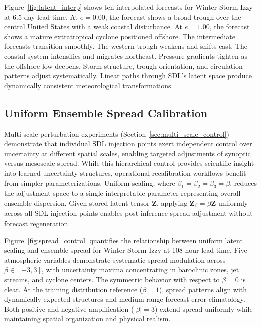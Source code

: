 \documentclass{agujournal2019}
\begin{document}
Figure~\ref{fig:latent_interp} shows ten interpolated forecasts for Winter Storm Izzy at 6.5-day lead time. At $e{=}0.00$, the forecast shows a broad trough over the central United States with a weak coastal disturbance. At $e{=}1.00$, the forecast shows a mature extratropical cyclone positioned offshore. The intermediate forecasts transition smoothly. The western trough weakens and shifts east. The coastal system intensifies and migrates northeast. Pressure gradients tighten as the offshore low deepens. Storm structure, trough orientation, and circulation patterns adjust systematically. Linear paths through SDL's latent space produce dynamically consistent meteorological transformations.

\subsection{Uniform Ensemble Spread Calibration}



Multi-scale perturbation experiments (Section~\ref{sec:multi_scale_control}) demonstrate that individual SDL injection points exert independent control over uncertainty at different spatial scales, enabling targeted adjustments of synoptic versus mesoscale spread. While this hierarchical control provides scientific insight into learned uncertainty structures, operational recalibration workflows benefit from simpler parameterizations. Uniform scaling, where $\beta_1 = \beta_2 = \beta_3 = \beta$, reduces the adjustment space to a single interpretable parameter representing overall ensemble dispersion. Given stored latent tensor $\mathbf{Z}$, applying $\mathbf{Z}_{\beta} = \beta \mathbf{Z}$ uniformly across all SDL injection points enables post-inference spread adjustment without forecast regeneration.

Figure~\ref{fig:spread_control} quantifies the relationship between uniform latent scaling and ensemble spread for Winter Storm Izzy at 108-hour lead time. Five atmospheric variables demonstrate systematic spread modulation across $\beta \in [-3, 3]$, with uncertainty maxima concentrating in baroclinic zones, jet streams, and cyclone centers. The symmetric behavior with respect to $\beta = 0$ is clear. At the training distribution reference ($\beta = 1$), spread patterns align with dynamically expected structures and medium-range forecast error climatology. Both positive and negative amplification ($|\beta| = 3$) extend spread uniformly while maintaining spatial organization and physical realism.
\end{document}
